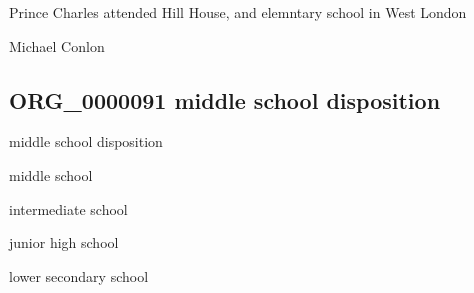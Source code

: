 \documentclass[letterpaper,10pt,english]{sphinxmanual}
\begin{document}
\begin{sphinxShadowBox}

\sphinxAtStartPar
Prince Charles attended Hill House, and elemntary school in West London
\end{sphinxShadowBox}

\begin{sphinxShadowBox}

\sphinxAtStartPar
Michael Conlon 
\end{sphinxShadowBox}
\begin{quote}

\ignorespaces \end{quote}


\subsection{ORG\_0000091 \sphinxhyphen{} middle school disposition}
\label{\detokenize{doc-ORG_0000091:org-0000091-middle-school-disposition}}\label{\detokenize{doc-ORG_0000091:index-0}}\label{\detokenize{doc-ORG_0000091::doc}}
\begin{sphinxShadowBox}

\sphinxAtStartPar
middle school disposition
\end{sphinxShadowBox}

\begin{sphinxShadowBox}

\sphinxAtStartPar
middle school
\end{sphinxShadowBox}

\begin{sphinxShadowBox}

\sphinxAtStartPar
intermediate school

\sphinxAtStartPar
junior high school

\sphinxAtStartPar
lower secondary school
\end{sphinxShadowBox}

\begin{sphinxShadowBox}

\sphinxAtStartPar
{\hyperref[\detokenize{doc-BFO_0000016::doc}]{}}
\end{sphinxShadowBox}
\end{document}
